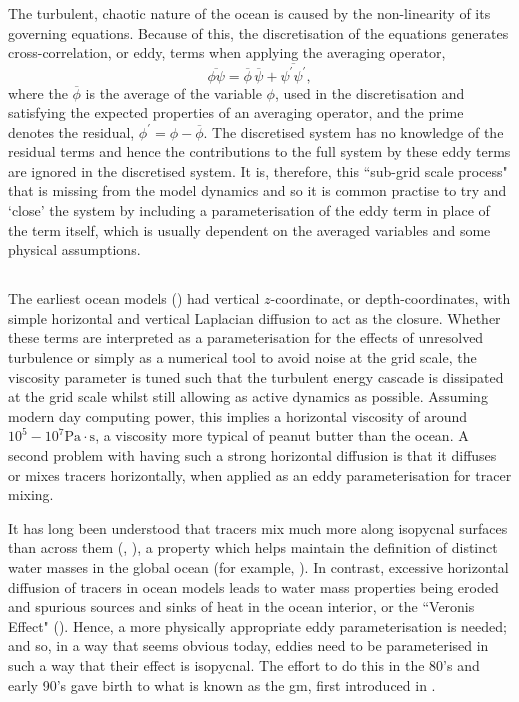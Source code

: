 \documentclass[12pt,a4paper]{report}
\newcommand*\mean[1]{\overline{#1}}
\newcommand*\res[1]{{#1}^{\prime}}
\begin{document}
 The turbulent, chaotic nature of the ocean is caused by the non-linearity of its 
 governing equations. Because of this,  the discretisation of the equations generates cross-correlation, or eddy, terms when applying the 
 averaging operator,
 \begin{equation}
 \mean{\phi\psi} = \mean{\phi}\,\mean{\psi} + 
 \mean{\res{\psi}\res{\psi}},
 \label{non-lin average}
 \end{equation}
 where the ${\mean{\phi}}$ is the average of the variable ${\phi}$, used in
 the discretisation and satisfying
 the expected properties of an averaging operator, and the prime denotes the residual, ${\phi^{\prime} = \phi - \mean{\phi}}$.
 The discretised system has no knowledge of the residual terms and hence
 the contributions to the full system by these eddy terms are
 ignored in the discretised system. It is, therefore, this ``sub-grid scale process"
 that is missing from the model dynamics and so it is common practise to try and
 `close' the system by including a parameterisation of the eddy
 term in place of the term itself, which is usually dependent on the averaged 
 variables and some physical assumptions.
 
 \subsection{\cite{gent1990}}
 
 The earliest ocean models (\cite{bryan1969numerical}) had vertical $z$-coordinate, or depth-coordinates, with simple horizontal and vertical Laplacian diffusion to act as 
 the closure. Whether these terms are interpreted as a parameterisation for the effects
 of unresolved turbulence or simply as a numerical tool to avoid noise at 
 the grid scale, the viscosity parameter is tuned such that the turbulent energy cascade is 
 dissipated at the grid scale whilst still allowing as active dynamics as possible. 
 Assuming modern day computing power, this implies a horizontal viscosity of around 
 $10^{5} - 10^{7} \mathrm{Pa} \cdot \mathrm{s}$, a viscosity more typical of peanut butter than 
 the ocean. A second problem with having such a strong horizontal diffusion is
 that it diffuses or mixes tracers horizontally, when applied as
 an eddy parameterisation for tracer mixing. 
 
 It has long been understood that tracers 
 mix much more along isopycnal surfaces than across them (\cite{iselin1939influence}, \cite{montgomery1940present}),  a property which helps maintain the definition of
 distinct water masses in the global ocean (for example, \cite{emery1986global}).
  In contrast, excessive horizontal diffusion
 of tracers in ocean models leads to water mass properties
 being eroded and spurious sources and sinks of heat in the 
 ocean interior, or the ``Veronis Effect" (\cite{veronis1975role}).
 Hence, a more physically appropriate eddy parameterisation 
 is needed;
  and so, in a way that seems obvious today, eddies need to be
   parameterised in 
 such a way that their effect is isopycnal. 
 The effort to do this in the 80's and early 90's gave birth
 to what is known as the \gls{gm}, first introduced in \cite{gent1990}.
 
\end{document}
